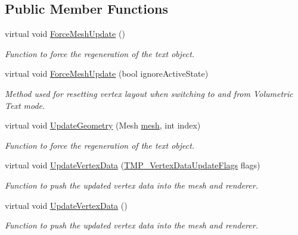 \subsection*{Public Member Functions}
\begin{DoxyCompactItemize}
\item 
virtual void \mbox{\hyperlink{class_t_m_pro_1_1_t_m_p___text_a93c463ff2bb3b846a468f3d1764bdef4}{Force\+Mesh\+Update}} ()
\begin{DoxyCompactList}\small\item\em Function to force the regeneration of the text object. \end{DoxyCompactList}\item 
virtual void \mbox{\hyperlink{class_t_m_pro_1_1_t_m_p___text_a2cd34e05c191658295c67c373e608f5d}{Force\+Mesh\+Update}} (bool ignore\+Active\+State)
\begin{DoxyCompactList}\small\item\em Method used for resetting vertex layout when switching to and from Volumetric Text mode. \end{DoxyCompactList}\item 
virtual void \mbox{\hyperlink{class_t_m_pro_1_1_t_m_p___text_a555f26eef9b5a5e51d27217c4c8adb8a}{Update\+Geometry}} (Mesh \mbox{\hyperlink{class_t_m_pro_1_1_t_m_p___text_af0f7359e71ac9ef7940c43c608bcea9f}{mesh}}, int index)
\begin{DoxyCompactList}\small\item\em Function to force the regeneration of the text object. \end{DoxyCompactList}\item 
virtual void \mbox{\hyperlink{class_t_m_pro_1_1_t_m_p___text_ae4079b9679758f2a086a0e9f63893475}{Update\+Vertex\+Data}} (\mbox{\hyperlink{namespace_t_m_pro_a517464fab2ef7ff5b9658d2acaf49a57}{T\+M\+P\+\_\+\+Vertex\+Data\+Update\+Flags}} flags)
\begin{DoxyCompactList}\small\item\em Function to push the updated vertex data into the mesh and renderer. \end{DoxyCompactList}\item 
virtual void \mbox{\hyperlink{class_t_m_pro_1_1_t_m_p___text_a63f0f98478ef7b8c9a314f74c9836e39}{Update\+Vertex\+Data}} ()
\begin{DoxyCompactList}\small\item\em Function to push the updated vertex data into the mesh and renderer. \end{DoxyCompactList}\item 

\end{DoxyCompactItemize}
